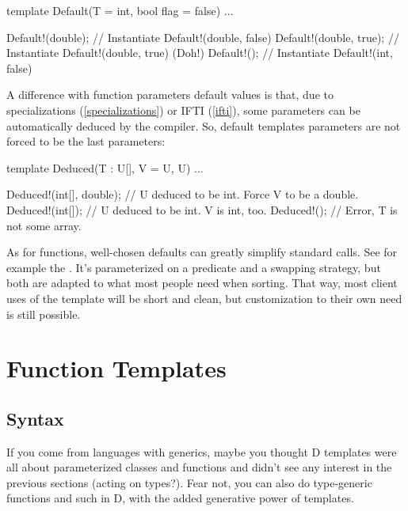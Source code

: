 \begin{dcode}
template Default(T = int, bool flag = false)
{ ... }

Default!(double);       // Instantiate Default!(double, false)
Default!(double, true); // Instantiate Default!(double, true) (Doh!)
Default!();             // Instantiate Default!(int, false)
\end{dcode}

A difference with function parameters default values is that, due to specializations (\ref{specializations}) or IFTI (\ref{ifti}), some parameters can be automatically deduced by the compiler. So, default templates parameters are not forced to be the last parameters:

\begin{dcode}
template Deduced(T : U[], V = U, U)
{ ... }

Deduced!(int[], double); // U deduced to be int. Force V to be a double.
Deduced!(int[]); // U deduced to be int. V is int, too.
Deduced!(); // Error, T is not some array.
\end{dcode}



As for functions, well-chosen defaults can greatly simplify standard calls. See for example the . It's parameterized on a predicate and a swapping strategy, but both are adapted to what most people need when sorting. That way, most client uses of the template will be short and clean, but customization to their own need is still possible.



\section{Function Templates}\label{functiontemplates}

\subsection{Syntax}\label{functiontemplatessyntax}

If you come from languages with generics, maybe you thought D templates were all about parameterized classes and functions and didn't see any interest in the previous sections (acting on types?). Fear not, you can also do type-generic functions and such in D, with the added generative power of templates.

